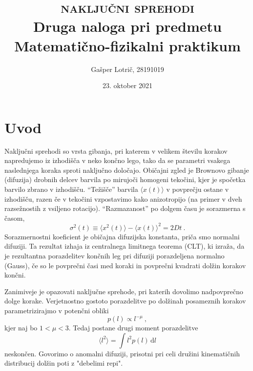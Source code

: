 \documentclass[a4paper, 12pt, slovene]{article}
\newcommand{\dd}{\,\mathrm{d}}
\begin{document}
\begin{titlepage}
\title{\textsc{naključni sprehodi} \\[1ex] \large Druga naloga pri predmetu Matematično-fizikalni praktikum}
\author{Gašper Lotrič, 28191019}
\date{23. oktober 2021}

\maketitle
\end{titlepage}

\tableofcontents
\pagebreak


\section{Uvod}
Naključni sprehodi so vrsta gibanja, pri katerem v velikem številu korakov napredujemo iz izhodišča v neko končno lego, tako da se parametri vsakega naslednjega koraka sproti naključno določajo.  Običajni zgled je Brownovo gibanje (difuzija) drobnih delcev barvila po mirujoči homogeni tekočini, kjer je spočetka barvilo zbrano v izhodišču.  ``Težišče'' barvila $\langle x(t)\rangle$ v povprečju ostane v izhodišču, razen če v tekočini vzpostavimo kako anizotropijo (na primer v dveh razsežnostih z vsiljeno rotacijo).  ``Razmazanost'' po dolgem času je sorazmerna s časom,
\begin{equation*}
  \sigma^2(t) \equiv \langle x^2(t)\rangle - \langle x(t)\rangle^2 = 2 D t \>.
\end{equation*}
Sorazmernostni koeficient je običajna difuzijska konstanta, priča smo normalni difuziji.  Ta rezultat izhaja iz
centralnega limitnega teorema (CLT), ki izraža, da je rezultantna porazdelitev končnih leg pri difuziji porazdeljena normalno (Gauss), če so le povprečni časi med koraki in povprečni kvadrati dolžin korakov končni.

Zanimiveje je opazovati naključne sprehode, pri katerih dovolimo nadpovprečno dolge korake.  Verjetnostno gostoto porazdelitve po dolžinah posameznih korakov parametrizirajmo v potenčni obliki
\begin{equation}
p(l) \propto l^{-\mu} \>,
\label{lpow}
\end{equation}
kjer naj bo $1 < \mu < 3$.  Tedaj postane drugi moment porazdelitve
\begin{equation*}
  \langle l^2\rangle = \int l^2 p(l) \dd l
\end{equation*}
neskončen.  Govorimo o anomalni difuziji, prisotni pri celi dru\v zini kinematičnih distribucij dolžin poti z "debelimi repi".
\end{document}
